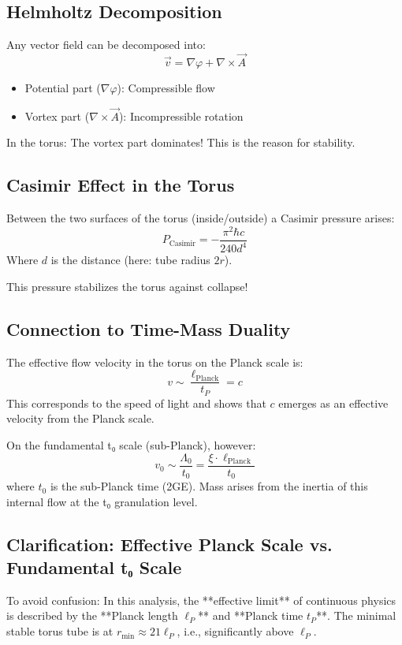 \documentclass[12pt,a4paper]{article}
\begin{document}
\subsection{Helmholtz Decomposition}
Any vector field can be decomposed into:
\[
\vec{v} = \nabla \varphi + \nabla \times \vec{A}
\]
\begin{itemize}
	\item Potential part (\( \nabla \varphi \)): Compressible flow
	\item Vortex part (\( \nabla \times \vec{A} \)): Incompressible rotation
\end{itemize}

In the torus: The vortex part dominates! This is the reason for stability.

\subsection{Casimir Effect in the Torus}
Between the two surfaces of the torus (inside/outside) a Casimir pressure arises:
\[
P_{\text{Casimir}} = -\frac{\pi^2 \hbar c}{240 d^4}
\]
Where \( d \) is the distance (here: tube radius \( 2r \)).

This pressure stabilizes the torus against collapse!

\subsection{Connection to Time-Mass Duality}
The effective flow velocity in the torus on the Planck scale is:
\[
v \sim \frac{\ell_{\text{Planck}}}{t_P} = c
\]
This corresponds to the speed of light and shows that \( c \) emerges as an effective velocity from the Planck scale.

On the fundamental t₀ scale (sub-Planck), however:
\[
v_0 \sim \frac{\Lambda_0}{t_0} = \frac{\xi \cdot \ell_{\text{Planck}}}{t_0}
\]
where \( t_0 \) is the sub-Planck time (2GE). Mass arises from the inertia of this internal flow at the t₀ granulation level.

\subsection{Clarification: Effective Planck Scale vs. Fundamental t₀ Scale}
To avoid confusion: In this analysis, the **effective limit** of continuous physics is described by the **Planck length \( \ell_P \)** and **Planck time \( t_P \)**. The minimal stable torus tube is at \( r_{\min} \approx 21 \ell_P \), i.e., significantly above \( \ell_P \).
\end{document}
